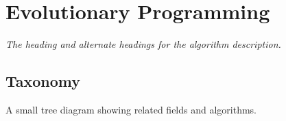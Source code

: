 

\section{Evolutionary Programming} 
\label{sec:evolutionary_programming}

\emph{The heading and alternate headings for the algorithm description.}

\subsection{Taxonomy}
A small tree diagram showing related fields and algorithms.

